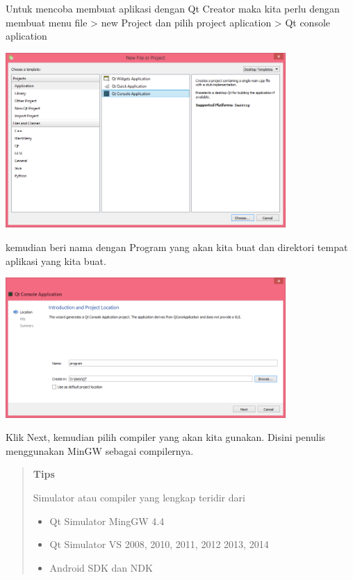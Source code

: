   Untuk mencoba membuat aplikasi dengan Qt Creator maka kita perlu
  dengan membuat menu file \textgreater{} new Project dan pilih project
  aplication \textgreater{} Qt console aplication

  \begin{center}

  \includegraphics[width=0.8\textwidth]{images/qt-console-aplication.png}

  \end{center}

  kemudian beri nama dengan Program yang akan kita buat dan direktori
  tempat aplikasi yang kita buat.

  \begin{center}

  \includegraphics[width=0.8\textwidth]{images/qt-console-aplication-2.png}

  \end{center}

  Klik Next, kemudian pilih compiler yang akan kita gunakan. Disini
  penulis menggunakan MinGW sebagai compilernya.


\begin{quotation}
	\textbf{Tips}
	
	Simulator 	 atau compiler yang lengkap teridir dari
	
	\begin{itemize}
		\tightlist
		\item
		Qt Simulator MingGW 4.4
		\item
		Qt Simulator VS 2008, 2010, 2011, 2012 2013, 2014
		\item
		Android SDK dan NDK
	\end{itemize}
\end{quotation}




